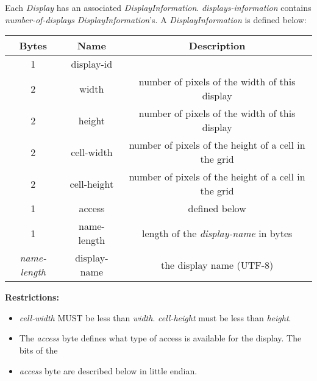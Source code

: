 \documentclass{article}
\begin{document}
    Each \emph{Display} has an associated \emph{DisplayInformation}. \emph{displays-information} contains
    \emph{number-of-displays} \emph{DisplayInformation}'s. A \emph{DisplayInformation} is defined below:

    \begin{center}
        \begin{tabular}{|c|c|c|}
            \hline
            \textbf{Bytes}     & \textbf{Name} & \textbf{Description}                                 \\
            \hline
            1                  & display-id    &                                                      \\
            \hline
            2                  & width         & number of pixels of the width of this display        \\
            \hline
            2                  & height        & number of pixels of the width of this display        \\
            \hline
            2                  & cell-width    & number of pixels of the height of a cell in the grid \\
            \hline
            2                  & cell-height   & number of pixels of the height of a cell in the grid \\
            \hline
            1                  & access        & defined below                                        \\
            \hline
            1                  & name-length   & length of the \emph{display-name} in bytes           \\
            \hline
            \emph{name-length} & display-name  & the display name (UTF-8)                             \\
            \hline
        \end{tabular}
    \end{center}

    \textbf{Restrictions:}

    \begin{itemize}
        \item \emph{cell-width} MUST be less than \emph{width}. \emph{cell-height} must be less than \emph{height}.\\
        \item The \emph{access} byte defines what type of access is available for the display. The bits of the
        \item \emph{access} byte are described below in little endian.
    \end{itemize}
\end{document}

